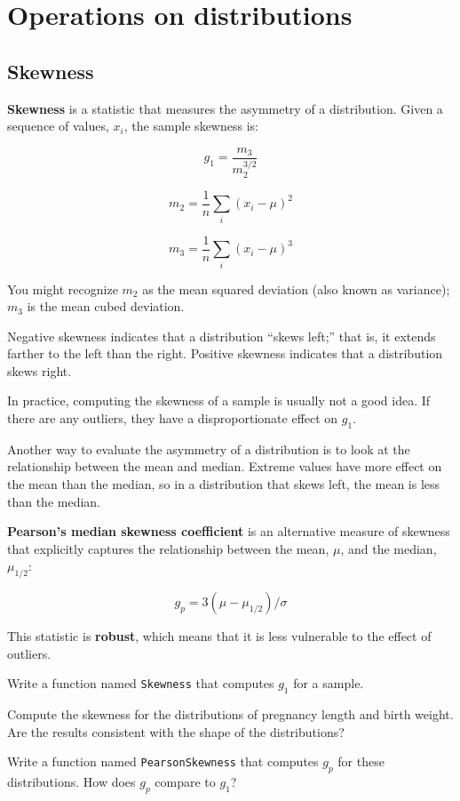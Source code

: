 \documentclass[12pt]{book}
\begin{document}
\chapter{Operations on distributions}
\label{operations}

\section{Skewness}

{\bf Skewness} is a statistic that measures the asymmetry of a
distribution.  Given a sequence of values, $x_i$, the sample skewness
is:

\[ g_1 = \frac{m_3}{m_2^{3/2}}\]

\[ m_2 = \frac{1}{n} \sum_i (x_i - \mu)^2 \]

\[ m_3 = \frac{1}{n} \sum_i (x_i - \mu)^3 \]

You might recognize $m_2$ as the mean squared deviation (also known as
variance); $m_3$ is the mean cubed deviation.

Negative skewness indicates that a distribution 
``skews left;'' that is, it extends
farther to the left than the right.  Positive skewness indicates
that a distribution skews right.

In practice, computing the skewness of a sample is usually not
a good idea.  If there are any outliers, they
have a disproportionate effect on $g_1$.

Another way to evaluate the asymmetry of a distribution is to look
at the relationship between the mean and median.
Extreme values have more effect on the mean than the median, so
in a distribution that skews left, the mean is less than the median.

{\bf Pearson's median skewness coefficient} is an alternative measure
of skewness that explicitly captures the relationship between the
mean, $\mu$, and the median, $\mu_{1/2}$:

\[ g_p = 3 (\mu - \mu_{1/2}) / \sigma \]

This statistic is {\bf robust}, which means that it is less vulnerable
to the effect of outliers.

\begin{ex}

Write a function named {\tt Skewness} that computes
$g_1$ for a sample.

Compute the skewness for the distributions of pregnancy length and
birth weight.  Are the results consistent with the shape of the
distributions?

Write a function named {\tt PearsonSkewness} that computes $g_p$
for these distributions.  How does $g_p$ compare to $g_1$?

\end{ex}
\end{document}
